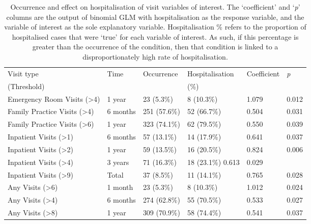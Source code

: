 \begin{table}[H]
   \caption[Occurrence and effect on hospitalisation of visit variables of interest]{Occurrence and effect on hospitalisation of visit variables of interest. The `coefficient' and `\textit{p}' columns are the output of binomial GLM with hospitalisation as the response variable, and the variable of interest as the sole explanatory variable. Hospitalisation \% refers to the proportion of hospitalised cases that were `true' for each variable of interest. As such, if this percentage is greater than the occurrence of the condition, then that condition is linked to a disproportionately high rate of hospitalisation.}
       \centering
\begin{tabular}{P{3.75cm}P{1.65cm}P{2.25cm}P{2.25cm}P{1.75cm}P{1cm}}
  \hline
Visit type  & Time & Occurrence & Hospitalisation  & Coefficient & \textit{p}\\ 
(Threshold) &&&(\%)&\\
  \hline
	Emergency Room Visits (\textgreater 4) & 1 year & 23 (5.3\%) & 8 (10.3\%) & 1.079 & 0.012\\ 
  Family Practice Visits (\textgreater 4) & 6 months & 251 (57.6\%) & 52 (66.7\%) & 0.504 & 0.031\\ 
  Family Practice Visits (\textgreater 6) & 1 year & 323 (74.1\%) & 62 (79.5\%) & 0.550 & 0.039\\ 
  Inpatient Visits (\textgreater 1) & 6 months & 57 (13.1\%) & 14 (17.9\%) & 0.641 & 0.037\\ 
  Inpatient Visits (\textgreater 2) & 1 year & 59 (13.5\%) & 16 (20.5\%) & 0.824 & 0.006\\ 
  Inpatient Visits (\textgreater 4) & 3 years & 71 (16.3\%) & 18 (23.1\%) 0.613 & 0.029\\ 
  Inpatient Visits (\textgreater 9) & Total & 37 (8.5\%) & 11 (14.1\%) & 0.765 & 0.028\\ 
  Any Visits (\textgreater 6) & 1 month & 23 (5.3\%) & 8 (10.3\%) & 1.012 & 0.024\\ 
   Any Visits (\textgreater 4) & 6 months & 274 (62.8\%) & 55 (70.5\%) &  0.533 & 0.027\\ 
  Any Visits (\textgreater 8) & 1 year & 309 (70.9\%) & 58 (74.4\%) & 0.541 & 0.037\\ 
   \hline
\end{tabular}\label{tab:additional-visits-interest}
\end{table}

